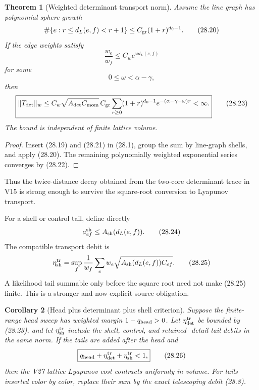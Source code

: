 \documentclass[11pt]{article}
\newtheorem{theorem}{Theorem}[section]
\newtheorem{corollary}[theorem]{Corollary}
\theoremstyle{remark}
\begin{document}
\begin{theorem}[Weighted determinant transport norm]
\label{thm:v15v28-det-tail}
Assume the line graph has polynomial sphere growth
\[
 \#\{e:r\le d_L(e,f)<r+1\}
 \le C_{\rm gr}(1+r)^{d_0-1}.                              \tag{28.20}
\]
If the edge weights satisfy
\[
 \frac{w_e}{w_f}\le C_we^{\omega d_L(e,f)}                 \tag{28.21}
\]
for some
\[
 0\le\omega<\alpha-\gamma,                                 \tag{28.22}
\]
then
\[
\boxed{
 \|T_{\det}\|_w
 \le
 C_w\sqrt{A_{\det}C_{\rm mom}}\,
 C_{\rm gr}
 \sum_{r\ge0}(1+r)^{d_0-1}
 e^{-(\alpha-\gamma-\omega)r}<\infty.}                     \tag{28.23}
\]
The bound is independent of finite lattice volume.
\end{theorem}

\begin{proof}
Insert (28.19) and (28.21) in (28.1), group the sum by
line-graph shells, and apply (28.20).  The remaining
polynomially weighted exponential series converges by (28.22).
\end{proof}

Thus the twice-distance decay obtained from the two-core determinant
trace in V15 is strong enough to survive the square-root conversion
to Lyapunov transport.

For a shell or control tail, define directly
\[
 a_{ef}^{\rm sh}
 \le A_{\rm sh}(d_L(e,f)).                                 \tag{28.24}
\]
The compatible transport debit is
\[
 \eta_{\rm sh}^{\rm tr}
 =
 \sup_f\frac1{w_f}\sum_e
 w_e\sqrt{
 A_{\rm sh}(d_L(e,f))C_{ef}}.                              \tag{28.25}
\]
A likelihood tail summable only before the square root need not
make (28.25) finite.  This is a stronger and now explicit source
obligation.

\begin{corollary}[Head plus determinant plus shell criterion]
\label{cor:v15v28-full}
Suppose the finite-range head sweep has weighted margin
\(1-q_{\rm head}>0\).  Let
\(\eta_{\det}^{\rm tr}\) be bounded by (28.23), and let
\(\eta_{\rm sh}^{\rm tr}\) include the shell, control, and retained-
detail tail debits in the same norm.  If the tails are added after
the head and
\[
 \boxed{
 q_{\rm head}
 +\eta_{\det}^{\rm tr}
 +\eta_{\rm sh}^{\rm tr}<1,}                               \tag{28.26}
\]
then the V27 lattice Lyapunov cost contracts uniformly in volume.
For tails inserted color by color, replace their sum by the exact
telescoping debit (28.8).
\end{corollary}
\end{document}
